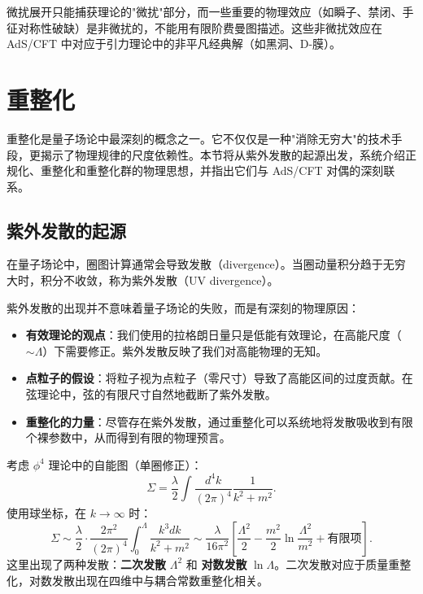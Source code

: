 \begin{remark}[微扰论与非微扰效应]
微扰展开只能捕获理论的"微扰"部分，而一些重要的物理效应（如瞬子、禁闭、手征对称性破缺）是非微扰的，不能用有限阶费曼图描述。这些非微扰效应在 AdS/CFT 中对应于引力理论中的非平凡经典解（如黑洞、D-膜）。
\end{remark}

\section{重整化}

重整化是量子场论中最深刻的概念之一。它不仅仅是一种"消除无穷大"的技术手段，更揭示了物理规律的尺度依赖性。本节将从紫外发散的起源出发，系统介绍正规化、重整化和重整化群的物理思想，并指出它们与 AdS/CFT 对偶的深刻联系。


\subsection{紫外发散的起源}

在量子场论中，圈图计算通常会导致发散（divergence）。当圈动量积分趋于无穷大时，积分不收敛，称为紫外发散（UV divergence）。

\begin{note}[紫外发散的物理意义]
紫外发散的出现并不意味着量子场论的失败，而是有深刻的物理原因：
\begin{itemize}
    \item \textbf{有效理论的观点}：我们使用的拉格朗日量只是低能有效理论，在高能尺度（$\sim \Lambda$）下需要修正。紫外发散反映了我们对高能物理的无知。
    \item \textbf{点粒子的假设}：将粒子视为点粒子（零尺寸）导致了高能区间的过度贡献。在弦理论中，弦的有限尺寸自然地截断了紫外发散。
    \item \textbf{重整化的力量}：尽管存在紫外发散，通过重整化可以系统地将发散吸收到有限个裸参数中，从而得到有限的物理预言。
\end{itemize}
\end{note}

\begin{example}
考虑 $\phi^4$ 理论中的自能图（单圈修正）：
\begin{equation}
    \Sigma = \frac{\lambda}{2}\int \frac{d^4 k}{(2\pi)^4}\frac{1}{k^2+m^2}.
\end{equation}
使用球坐标，在 $k \to \infty$ 时：
\begin{equation}
    \Sigma \sim \frac{\lambda}{2}\cdot\frac{2\pi^2}{(2\pi)^4}\int_0^\Lambda \frac{k^3 dk}{k^2+m^2} \sim \frac{\lambda}{16\pi^2}\left[\frac{\Lambda^2}{2} - \frac{m^2}{2}\ln\frac{\Lambda^2}{m^2} + \text{有限项}\right].
\end{equation}
这里出现了两种发散：\textbf{二次发散} $\Lambda^2$ 和 \textbf{对数发散} $\ln\Lambda$。二次发散对应于质量重整化，对数发散出现在四维中与耦合常数重整化相关。
\end{example}

